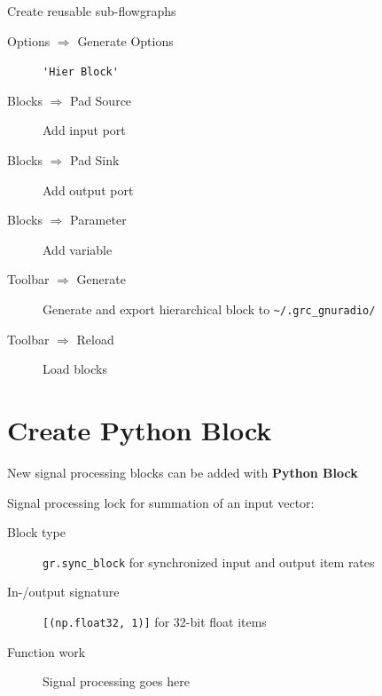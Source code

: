 \documentclass[10pt]{article}
\begin{document}
\begin{multicols*}{3}
Create reusable sub-flowgraphs

\begin{description}
\item[Options $\Rightarrow$ Generate Options] \verb|'Hier Block'|
\item[Blocks $\Rightarrow$ Pad Source] Add input port
\item[Blocks $\Rightarrow$ Pad Sink] Add output port
\item[Blocks $\Rightarrow$ Parameter] Add variable
\item[Toolbar $\Rightarrow$ Generate] Generate and export hierarchical block  to \verb|~/.grc_gnuradio/|
\item[Toolbar $\Rightarrow$ Reload] Load blocks
\end{description}

\section*{Create Python Block}

New signal processing blocks can be added with \textbf{Python Block}


Signal processing lock for summation of an input vector:
\begin{description}
\item[Block type] \verb|gr.sync_block| for synchronized input and output item rates

\item[In-/output signature] \verb|[(np.float32, 1)]| for 32-bit float items

\item[Function work] Signal processing goes here
\end{description}

%
%
%


\end{multicols*}
\end{document}
